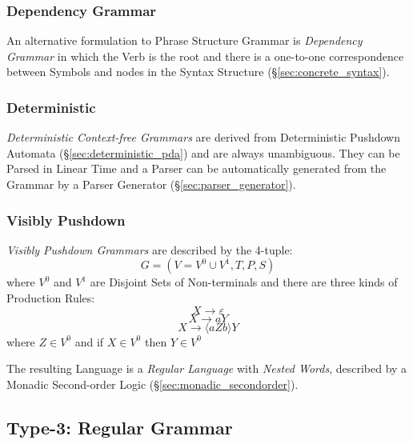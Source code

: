 \subsubsection{Dependency Grammar}\label{sec:dependency_grammar}

An alternative formulation to Phrase Structure Grammar is \emph{Dependency
  Grammar} in which the Verb is the root and there is a one-to-one
correspondence between Symbols and nodes in the Syntax Structure
(\S\ref{sec:concrete_syntax}).



\subsubsection{Deterministic}\label{sec:deterministic_cfg}

\emph{Deterministic Context-free Grammars} are derived from Deterministic
Pushdown Automata (\S\ref{sec:deterministic_pda}) and are always unambiguous.
They can be Parsed in Linear Time and a Parser can be automatically generated
from the Grammar by a Parser Generator (\S\ref{sec:parser_generator}).



\subsubsection{Visibly Pushdown}\label{sec:visibly_pushdown}

\emph{Visibly Pushdown Grammars} are described by the 4-tuple:
\[
  G = (V=V^0 \cup V^1,T,P,S)
\]
where $V^0$ and $V^1$ are Disjoint Sets of Non-terminals and there are three
kinds of Production Rules:
\[
  X \rightarrow \varepsilon
\]\[
  X \rightarrow aY
\]\[
  X \rightarrow \langle aZb \rangle Y
\]
where $Z \in V^0$ and if $X \in V^0$ then $Y \in V^0$

The resulting Language is a \emph{Regular Language} with \emph{Nested Words},
described by a Monadic Second-order Logic (\S\ref{sec:monadic_secondorder}).



\subsection{Type-3: Regular Grammar} \label{sec:regular_language}

